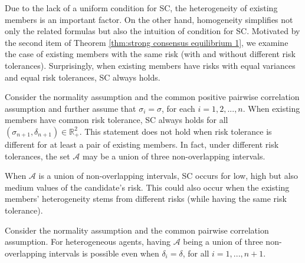 \documentclass[fleqn,mnsc,nonblindrev]{informs4}
\begin{document}
Due to the lack of a uniform condition for SC, the heterogeneity of existing members is an important factor. On the other hand, homogeneity simplifies not only the related formulas but also the intuition of condition for SC. Motivated by the second item of Theorem \ref{thm:strong consensus equilibrium 1}, we examine the case of existing members with the same risk (with and without different risk tolerances). Surprisingly, when existing members have risks with equal variances and equal risk tolerances, SC always holds.

\begin{theorem}\label{thm:common sigma}
Consider the normality assumption and the common positive pairwise correlation assumption and further assume that $\sigma_i=\sigma$, for each $i=1,2,...,n$. When existing members have common risk tolerance, SC always holds for all $(\sigma_{n+1},\delta_{n+1})\in\mathbb{R}^2_+$. This statement does not hold when risk tolerance is different for at least a pair of existing members. In fact, under different risk tolerances, the set $\mathcal{A}$ may be a union of three non-overlapping intervals.
\end{theorem}

When $\mathcal{A}$ is a union of non-overlapping intervals, SC occurs for low, high but also medium values of the candidate's risk. This could also occur when the existing members' heterogeneity stems from different risks (while having the same risk tolerance). 
\begin{theorem}\label{thm:common tolerance}
Consider the normality assumption and the common pairwise correlation assumption. For heterogeneous agents, having $\mathcal{A}$ being a union of three non-overlapping intervals is possible even when $\delta_i=\delta$, for all $i=1,...,n+1$.
\end{theorem}
\end{document}
